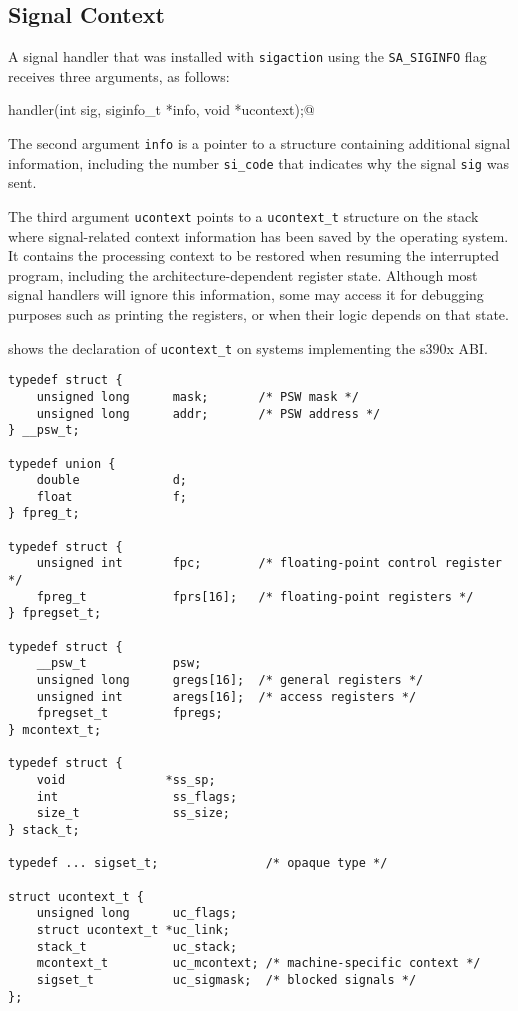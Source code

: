 \documentclass[english,11pt,twoside,toc=bib,toc=idx]{scrreprt}
\newcommand{\ABINAME}{s390x}
\newcommand{\ABINAME}{s390}
\begin{document}
\subsection{Signal Context}
A signal handler that was installed with \texttt{sigaction} using the
\texttt{SA\_SIGINFO} flag receives three arguments, as follows:
\begin{center}
  \lstinline@void handler(int sig, siginfo_t *info, void *ucontext);@
\end{center}
The second argument \texttt{info} is a pointer to a structure containing
additional signal information, including the number \texttt{si\_code} that
indicates why the signal \texttt{sig} was sent.

The third argument \texttt{ucontext} points to a \texttt{ucontext\_t}
structure on the stack where signal-related context information has been
saved by the operating system.  It contains the processing context to be
restored when resuming the interrupted program, including the
architecture-dependent register state.  Although most signal handlers will
ignore this information, some may access it for debugging purposes such as
printing the registers, or when their logic depends on that state.

 shows the declaration of \texttt{ucontext\_t} on
systems implementing the \ABINAME{} ABI.

\begin{lstlisting}[style=float,caption={[The \texttt{ucontext\_t}
    structure]The \texttt{ucontext\_t} structure.  The size of
    \texttt{uc\_sigmask} may vary, and additional information may be
    stored after it.},label={lst:ucontext}]
typedef struct {
    unsigned long      mask;       /* PSW mask */
    unsigned long      addr;       /* PSW address */
} __psw_t;

typedef union {
    double             d;
    float              f;
} fpreg_t;

typedef struct {
    unsigned int       fpc;        /* floating-point control register */
    fpreg_t            fprs[16];   /* floating-point registers */
} fpregset_t;

typedef struct {
    __psw_t            psw;
    unsigned long      gregs[16];  /* general registers */
    unsigned int       aregs[16];  /* access registers */
    fpregset_t         fpregs;
} mcontext_t;

typedef struct {
    void              *ss_sp;
    int                ss_flags;
    size_t             ss_size;
} stack_t;

typedef ... sigset_t;               /* opaque type */

struct ucontext_t {
    unsigned long      uc_flags;
    struct ucontext_t *uc_link;
    stack_t            uc_stack;
    mcontext_t         uc_mcontext; /* machine-specific context */
    sigset_t           uc_sigmask;  /* blocked signals */
};
\end{lstlisting}
\end{document}
